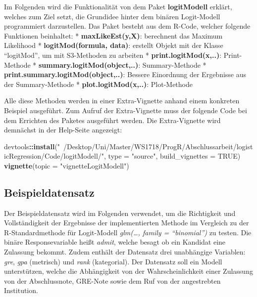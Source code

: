 \documentclass[12pt,]{article}
\newenvironment{Shaded}{\begin{snugshade}}{\end{snugshade}}
\newcommand{\KeywordTok}[1]{\textcolor[rgb]{0.13,0.29,0.53}{\textbf{#1}}}
\newcommand{\DataTypeTok}[1]{\textcolor[rgb]{0.13,0.29,0.53}{#1}}
\newcommand{\StringTok}[1]{\textcolor[rgb]{0.31,0.60,0.02}{#1}}
\newcommand{\OtherTok}[1]{\textcolor[rgb]{0.56,0.35,0.01}{#1}}
\newcommand{\OperatorTok}[1]{\textcolor[rgb]{0.81,0.36,0.00}{\textbf{#1}}}
\newcommand{\NormalTok}[1]{#1}
\begin{document}
Im Folgenden wird die Funktionalität von dem Paket \textbf{logitModell}
erklärt, welches zum Ziel setzt, die Grundidee hinter dem binären
Logit-Modell programmiert darzustellen. Das Paket besteht aus dem
R-Code, welcher folgende Funktionen beinhaltet: *
\textbf{maxLikeEst(y,X)}: berechnent das Maximum Likelihood *
\textbf{logitMod(formula, data)}: erstellt Objekt mit der Klasse
``logitMod'', um mit S3-Methoden zu arbeiten *
\textbf{print.logitMod(x,..)}: Print-Methode *
\textbf{summary.logitMod(object,..)}: Summary-Methode *
\textbf{print.summary.logitMod(object,..)}: Bessere Einordnung der
Ergebnisse aus der Summary-Methode * \textbf{plot.logitMod(x,..)}:
Plot-Methode

Alle diese Methoden werden in einer Extra-Vignette anhand einem
konkreten Beispiel ausgeführt. Zum Aufruf der Extra-Vignette muss der
folgende Code bei dem Errichten des Paketes ausgeführt werden. Die
Extra-Vignette wird demnächst in der Help-Seite angezeigt:

\begin{Shaded}
\begin{Highlighting}[]
\NormalTok{devtools}\OperatorTok{::}\KeywordTok{install}\NormalTok{(}\StringTok{"~/Desktop/Uni/Master/WS1718/ProgR/Abschlussarbeit/logisticRegression/Code/logitModell/"}\NormalTok{, }\DataTypeTok{type =} \StringTok{"source"}\NormalTok{, }\DataTypeTok{build_vignettes =} \OtherTok{TRUE}\NormalTok{)}
\KeywordTok{vignette}\NormalTok{(}\DataTypeTok{topic =} \StringTok{"vignetteLogitModell"}\NormalTok{)}
\end{Highlighting}
\end{Shaded}

\subsection{Beispieldatensatz}\label{beispieldatensatz}

Der Beispieldatensatz wird im Folgenden verwendet, um die Richtigkeit
und Vollständigkeit der Ergebnisse der implementierten Methode im
Vergleich zu der R-Standardmethode für Logit-Modell \emph{glm(\ldots{},
family = ``binomial'')} zu testen. Die binäre Responsevariable heißt
\emph{admit}, welche besagt ob ein Kandidat eine Zulassung bekommt.
Zudem enthält der Datensatz drei unabhängige Variablen: \emph{gre},
\emph{gpa} (metrisch) und \emph{rank} (kategorial). Der Datensatz soll
ein Modell unterstützen, welche die Abhängigkeit von der
Wahrscheinlichkeit einer Zulassung von der Abschlussnote, GRE-Note sowie
dem Ruf von der angestrebten Institution.
\end{document}
